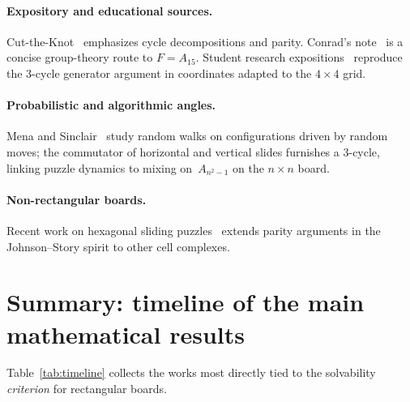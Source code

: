\paragraph{Expository and educational sources.}
Cut-the-Knot~\cite{CutTheKnotFifteen} emphasizes cycle decompositions and parity.
Conrad's note~\cite{Conrad15Puzzle} is a concise group-theory route to $F=A_{15}$.
Student research expositions~\cite{LimMIT2018,BeelerFifteen} reproduce the $3$-cycle generator argument in coordinates adapted to the $4\times 4$ grid.

\paragraph{Probabilistic and algorithmic angles.}
Mena and Sinclair~\cite{MenaSinclair2019} study random walks on configurations driven by random moves; the commutator of horizontal and vertical slides furnishes a $3$-cycle, linking puzzle dynamics to mixing on~$A_{n^2-1}$ on the $n\times n$ board.

\paragraph{Non-rectangular boards.}
Recent work on hexagonal sliding puzzles~\cite{HexagonalSliding2025} extends parity arguments in the Johnson--Story spirit to other cell complexes.

\section{Summary: timeline of the main mathematical results}\label{sec:timeline}

Table~\ref{tab:timeline} collects the works most directly tied to the solvability \emph{criterion} for rectangular boards.


